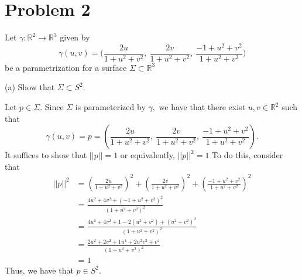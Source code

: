 \documentclass[11pt]{article}
\newcommand{\bbR}{\mathbb{R}}
\begin{document}
\section*{Problem 2}
\begin{problem}
    Let $\gamma:\mathbb{R}^2\rightarrow\mathbb{R}^3$ given by
\begin{equation*}
\gamma(u,v)=\bigg(\frac{2u}{1+u^2+v^2},\:\frac{2v}{1+u^2+v^2},\:\frac{-1+u^2+v^2}
{1+u^2+v^2}\bigg)
\end{equation*}
\noindent be a parametrization for a surface $\Sigma\subset\mathbb{R}^3$
\end{problem}
\begin{itemize}
\begin{problem}
    \item[(a)] Show that $\Sigma\subset S^2$.
    \end{problem}
    \begin{solution}Let $p \in \Sigma.$ Since $\Sigma$ is parameterized by $\gamma,$ we have that there exist $u, v\in \bbR^2$ such that 
        \[\gamma(u, v) = p = \left(\frac{2u}{1+u^2+v^2},\:\frac{2v}{1+u^2+v^2},\:\frac{-1+u^2+v^2}
{1+u^2+v^2}\right).\] It suffices to show that $||p|| = 1$ or equivalently, $||p||^2 = 1$ To do this, consider that 
\begin{align*}
    ||p||^2 &= (\frac{2u}{1+u^2+v^2})^2 + (\frac{2v}{1+u^2+v^2})^2 + (\frac{-1+u^2+v^2}
{1+u^2+v^2})^2\\
&= \frac{4u^2 + 4v^2 + (-1 + u^2 + v^2)^2}{(1 + u^2 + v^2)^2}\\
&= \frac{4u^2 + 4v^2 + 1 - 2(u^2 + v^2) + (u^2 + v^2)^2}{(1 + u^2 + v^2)^2}\\
&= \frac{2u^2 + 2v^2 + 1 u^4 + 2u^2v^2 + v^4}{(1 + u^2 + v^2)^2}\\
&= 1
\end{align*} Thus, we have that $p \in S^2.$
\end{solution}
\begin{problem}
    

\end{problem}
\end{itemize}
\end{document}
